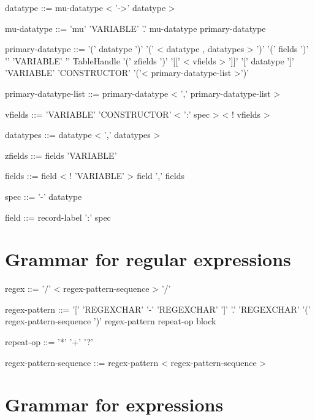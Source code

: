 \documentclass[11pt,a4paper]{article}
\begin{document}
\begin{grammar}
datatype ::= mu-datatype < '->' datatype >

mu-datatype ::= 'mu' 'VARIABLE' '.' mu-datatype
                primary-datatype

primary-datatype ::= '(' datatype ')'
                     '(' < datatype , datatypes > ')'
                     '(' fields ')'
                     '{' 'VARIABLE' '}'
                     TableHandle '(' zfields ')'
                     '[[' < vfields > ']]'
                     '[' datatype ']'
                     'VARIABLE'
                     'CONSTRUCTOR' '('< primary-datatype-list >')'

primary-datatype-list ::= primary-datatype < ',' primary-datatype-list >

vfields ::=  'VARIABLE' 
             'CONSTRUCTOR' < ':' spec >  < ! vfields >

datatypes ::= datatype < ',' datatypes >

zfields ::= fields
            'VARIABLE'

fields ::=  field < ! 'VARIABLE' > 
            field ',' fields

spec ::= '-'
         datatype

field ::= record-label ':' spec
\end{grammar}

\section{Grammar for regular expressions}

\begin{grammar}
regex ::=  '/' < regex-pattern-sequence >  '/'

regex-pattern ::= '[' 'REGEXCHAR' '-' 'REGEXCHAR' ']' 
                  '.'
                  'REGEXCHAR'
                  '(' regex-pattern-sequence ')'
                  regex-pattern repeat-op
                  block

repeat-op ::= '*'
              '+'
              '?'

regex-pattern-sequence ::= regex-pattern < regex-pattern-sequence >
\end{grammar}

\section{Grammar for expressions}
\end{document}
